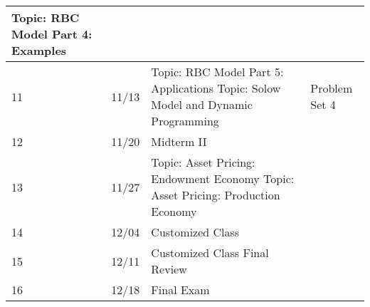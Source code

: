 \documentclass[12pt]{article}
\begin{document}
\begin{tabular}{|p{\bb}|p{\bb}|p{\pp}|p{\rr}|}
        \newline
        Topic: RBC Model Part 4: Examples
        &
    \\
    \hline
        11
        &
        11/13
        &
        Topic: RBC Model Part 5: Applications
        \newline
        Topic: Solow Model and Dynamic Programming
        &
        Problem Set 4
    \\
    \hline
        12
        &
        11/20
        &
        Midterm II
        &
    \\
    \hline
        13
        &
        11/27
        &
        Topic: Asset Pricing: Endowment Economy
        \newline
        Topic: Asset Pricing: Production Economy
        &
    \\
    \hline
        14
        &
        12/04
        &
        Customized Class
        &
    \\
    \hline
        15
        &
        12/11
        &
        Customized Class
        \newline
        Final Review
        &
    \\
    \hline
        16
        &
        12/18
        &
        Final Exam
        &
    \\
    \hline
\end{tabular}
\end{document}
